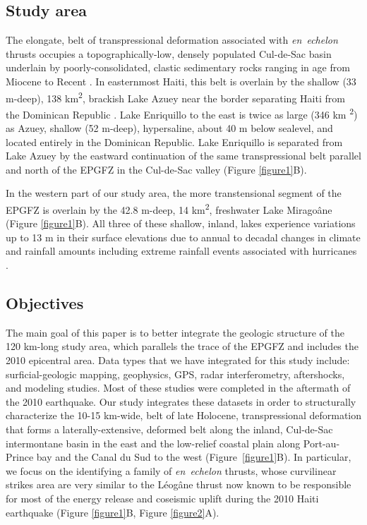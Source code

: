 \documentclass[linenumbers,draft]{agujournal}
\begin{document}
\subsection{Study area}
The elongate, belt of transpressional deformation associated with \textit{en~echelon} thrusts occupies a topographically-low, densely populated Cul-de-Sac basin underlain by poorly-consolidated, clastic sedimentary rocks ranging in age from Miocene to Recent \citep{massoni1955haiti,mann1995actively,terrier2014revision,saint2015seismotectonics}. In easternmost Haiti, this belt is overlain by the shallow (33 m-deep), 138 km\textsuperscript{2}, brackish Lake Azuey near the border separating Haiti from the Dominican Republic \citep{wright2015factors,piasecki2016bathymetric}. Lake Enriquillo to the east is twice as large (346 km \textsuperscript{2}) as Azuey, shallow (52 m-deep), hypersaline, about 40 m below sealevel, and located entirely in the Dominican Republic. Lake Enriquillo is separated from Lake Azuey by the eastward continuation of the same transpressional belt parallel and north of the EPGFZ in the Cul-de-Sac valley \citep{mann1995actively} (Figure \ref{figure1}B). 

In the western part of our study area, the more transtensional segment of the EPGFZ is overlain by the 42.8 m-deep, 14 km\textsuperscript{2}, freshwater Lake Mirago\^ane (Figure \ref{figure1}B). All three of these shallow, inland, lakes experience variations up to 13 m in their surface elevations due to annual to decadal changes in climate and rainfall amounts including extreme rainfall events associated with hurricanes \citep{wright2015factors,piasecki2016bathymetric,moknatian2017development,rico2017hydrodynamic}.  

\subsection{Objectives}
The main goal of this paper is to better integrate the geologic structure of the 120 km-long study area, which parallels the trace of the EPGFZ and includes the 2010 epicentral area. Data types that we have integrated for this study include: surficial-geologic mapping, geophysics, GPS, radar interferometry, aftershocks, and modeling studies. Most of these studies were completed in the aftermath of the 2010 earthquake. Our study integrates these datasets in order to structurally characterize the 10-15 km-wide, belt of late Holocene, transpressional deformation that forms a laterally-extensive, deformed belt along the inland, Cul-de-Sac intermontane basin in the east and the low-relief coastal plain along Port-au-Prince bay and the Canal du Sud to the west (Figure~\ref{figure1}B). In particular, we focus on the identifying a family of \textit{en~echelon} thrusts, whose curvilinear strikes area are very similar to the L\'eog\^ane thrust now known to be responsible for most of the energy release and coseismic uplift during the 2010 Haiti earthquake \citep{calais2010transpressional,douilly2013crustal,douilly2015three} (Figure \ref{figure1}B, Figure \ref{figure2}A).
\end{document}
